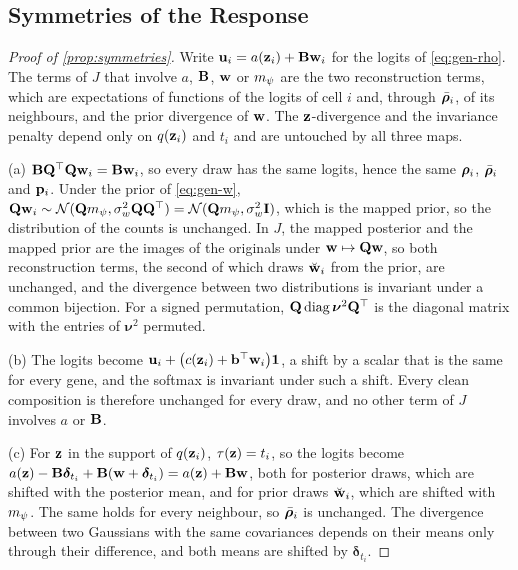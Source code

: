 \subsection{Symmetries of the Response}
\label{app:symmetries}

\begin{proof}[Proof of \cref{prop:symmetries}]
Write $\mathbf{u}_i = a(\mathbf{z}_i) + \mathbf{B}\mathbf{w}_i$ for the logits of \cref{eq:gen-rho}. The terms of $J$ that involve $a$, $\mathbf{B}$, $\mathbf{w}$ or $m_{\psi}$ are the two reconstruction terms, which are expectations of functions of the logits of cell $i$ and, through $\bar{\boldsymbol{\rho}}_i$, of its neighbours, and the prior divergence of $\mathbf{w}$. The $\mathbf{z}$-divergence and the invariance penalty depend only on $q(\mathbf{z}_i)$ and $t_i$ and are untouched by all three maps.

(a) $\mathbf{B}\mathbf{Q}^\top\mathbf{Q}\mathbf{w}_i = \mathbf{B}\mathbf{w}_i$, so every draw has the same logits, hence the same $\boldsymbol{\rho}_i$, $\bar{\boldsymbol{\rho}}_i$ and $\mathbf{p}_i$. Under the prior of \cref{eq:gen-w}, $\mathbf{Q}\mathbf{w}_i \sim \mathcal{N}(\mathbf{Q}m_{\psi}, \sigma_w^2\mathbf{Q}\mathbf{Q}^\top) = \mathcal{N}(\mathbf{Q}m_{\psi}, \sigma_w^2\mathbf{I})$, which is the mapped prior, so the distribution of the counts is unchanged. In $J$, the mapped posterior and the mapped prior are the images of the originals under $\mathbf{w} \mapsto \mathbf{Q}\mathbf{w}$, so both reconstruction terms, the second of which draws $\breve{\mathbf{w}}_i$ from the prior, are unchanged, and the divergence between two distributions is invariant under a common bijection. For a signed permutation, $\mathbf{Q}\operatorname{diag}\boldsymbol{\nu}^2\mathbf{Q}^\top$ is the diagonal matrix with the entries of $\boldsymbol{\nu}^2$ permuted.

(b) The logits become $\mathbf{u}_i + \big(c(\mathbf{z}_i) + \mathbf{b}^\top\mathbf{w}_i\big)\mathbf{1}$, a shift by a scalar that is the same for every gene, and the softmax is invariant under such a shift. Every clean composition is therefore unchanged for every draw, and no other term of $J$ involves $a$ or $\mathbf{B}$.

(c) For $\mathbf{z}$ in the support of $q(\mathbf{z}_i)$, $\tau(\mathbf{z}) = t_i$, so the logits become $a(\mathbf{z}) - \mathbf{B}\boldsymbol{\delta}_{t_i} + \mathbf{B}(\mathbf{w} + \boldsymbol{\delta}_{t_i}) = a(\mathbf{z}) + \mathbf{B}\mathbf{w}$, both for posterior draws, which are shifted with the posterior mean, and for prior draws $\breve{\mathbf{w}}_i$, which are shifted with $m_{\psi}$. The same holds for every neighbour, so $\bar{\boldsymbol{\rho}}_i$ is unchanged. The divergence between two Gaussians with the same covariances depends on their means only through their difference, and both means are shifted by $\boldsymbol{\delta}_{t_i}$.


\end{proof}
